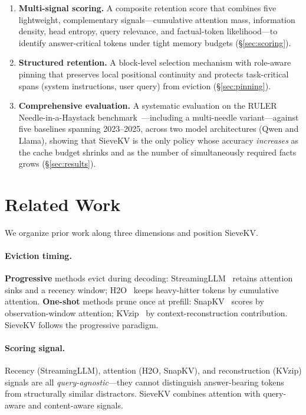 \documentclass[runningheads]{llncs}
\begin{document}
\begin{enumerate}
\item \textbf{Multi-signal scoring.}
  A composite retention score that combines five lightweight, complementary
  signals---cumulative attention mass, information density, head entropy,
  query relevance, and factual-token likelihood---to identify answer-critical
  tokens under tight memory budgets (\S\ref{sec:scoring}).

\item \textbf{Structured retention.}
  A block-level selection mechanism with role-aware pinning that preserves
  local positional continuity and protects task-critical spans (system
  instructions, user query) from eviction (\S\ref{sec:pinning}).

\item \textbf{Comprehensive evaluation.}
  A systematic evaluation on the RULER Needle-in-a-Haystack
  benchmark~\cite{hsieh2024ruler}---including a multi-needle variant---against
  five baselines spanning 2023--2025, across two model architectures (Qwen and
  Llama), showing that SieveKV is the only policy whose accuracy
  \emph{increases} as the cache budget shrinks and as the number of
  simultaneously required facts grows (\S\ref{sec:results}).
\end{enumerate}

\section{Related Work}
\label{sec:related}

We organize prior work along three dimensions and position SieveKV.

\paragraph{Eviction timing.}
\textbf{Progressive} methods evict during decoding:
StreamingLLM~\cite{xiao2023streamingllm} retains attention sinks and a
recency window; H2O~\cite{zhang2023h2o} keeps heavy-hitter tokens by
cumulative attention.
\textbf{One-shot} methods prune once at prefill:
SnapKV~\cite{li2024snapkv} scores by observation-window attention;
KVzip~\cite{he2025kvzip} by context-reconstruction contribution.
SieveKV follows the progressive paradigm.

\paragraph{Scoring signal.}
Recency (StreamingLLM), attention (H2O, SnapKV), and reconstruction
(KVzip) signals are all \emph{query-agnostic}---they cannot distinguish
answer-bearing tokens from structurally similar distractors.
SieveKV combines attention with query-aware and content-aware signals.
\end{document}
